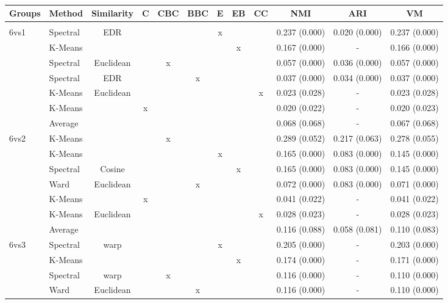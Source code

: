 \documentclass[12pt,a4paper,bibliography=totocnumbered,listof=totocnumbered]{scrartcl}
\begin{document}
{\begin{appendix}
\begin{table}[!htbp] \centering 
	\caption{} 
	\label{} 
	\scriptsize 
	\begin{tabular}{@{\extracolsep{0pt}} llcccccccccc} 
		\toprule
		Groups & Method & Similarity & C & CBC & BBC & E & EB & CC & NMI & ARI & VM \\ 
		\hline \\[-1.8ex] 
		6vs1 & Spectral & EDR &  &  &  & x &  &  & 0.237 (0.000) & 0.020 (0.000) & 0.237 (0.000) \\ 
		& K-Means &  &  &  &  &  & x &  & 0.167 (0.000) & - & 0.166 (0.000) \\ 
		& Spectral & Euclidean &  & x &  &  &  &  & 0.057 (0.000) & 0.036 (0.000) & 0.057 (0.000) \\ 
		& Spectral & EDR &  &  & x &  &  &  & 0.037 (0.000) & 0.034 (0.000) & 0.037 (0.000) \\ 
		& K-Means & Euclidean &  &  &  &  &  & x & 0.023 (0.028) & - & 0.023 (0.028) \\ 
		& K-Means &  & x &  &  &  &  &  & 0.020 (0.022) & - & 0.020 (0.023) \\ 
		& Average &  &  &  &  &  &  &  & 0.068 (0.068) & - & 0.067 (0.068) \\ 
		6vs2 & K-Means &  &  & x &  &  &  &  & 0.289 (0.052) & 0.217 (0.063) & 0.278 (0.055) \\ 
		& K-Means &  &  &  &  & x &  &  & 0.165 (0.000) & 0.083 (0.000) & 0.145 (0.000) \\ 
		& Spectral & Cosine &  &  &  &  & x &  & 0.165 (0.000) & 0.083 (0.000) & 0.145 (0.000) \\ 
		& Ward & Euclidean &  &  & x &  &  &  & 0.072 (0.000) & 0.083 (0.000) & 0.071 (0.000) \\ 
		& K-Means &  & x &  &  &  &  &  & 0.041 (0.022) & - & 0.041 (0.022) \\ 
		& K-Means & Euclidean &  &  &  &  &  & x & 0.028 (0.023) & - & 0.028 (0.023) \\ 
		& Average &  &  &  &  &  &  &  & 0.116 (0.088) & 0.058 (0.081) & 0.110 (0.083) \\ 
		6vs3 & Spectral & warp &  &  &  & x &  &  & 0.205 (0.000) & - & 0.203 (0.000) \\ 
		& K-Means &  &  &  &  &  & x &  & 0.174 (0.000) & - & 0.171 (0.000) \\ 
		& Spectral & warp &  & x &  &  &  &  & 0.116 (0.000) & - & 0.110 (0.000) \\ 
		& Ward & Euclidean &  &  & x &  &  &  & 0.116 (0.000) & - & 0.110 (0.000) \\ 

\end{tabular}
\end{table}
\end{appendix}}
\end{document}
